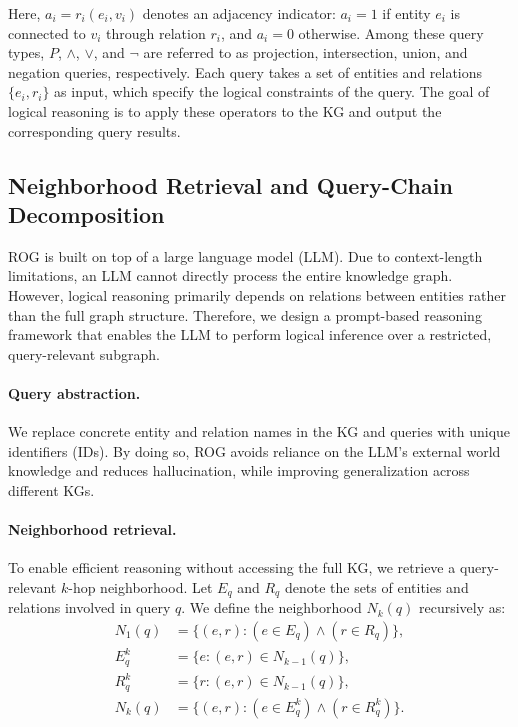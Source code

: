 \documentclass[11pt]{article}
\begin{document}
Here, $a_i = r_i(e_i, v_i)$ denotes an adjacency indicator:
$a_i = 1$ if entity $e_i$ is connected to $v_i$ through relation $r_i$, and $a_i = 0$ otherwise.
Among these query types, $P$, $\wedge$, $\vee$, and $\neg$ are referred to as projection, intersection, union, and negation queries, respectively.
Each query takes a set of entities and relations $\{e_i, r_i\}$ as input, which specify the logical constraints of the query.
The goal of logical reasoning is to apply these operators to the KG and output the corresponding query results.

\subsection{Neighborhood Retrieval and Query-Chain Decomposition}
ROG is built on top of a large language model (LLM).
Due to context-length limitations, an LLM cannot directly process the entire knowledge graph.
However, logical reasoning primarily depends on relations between entities rather than the full graph structure.
Therefore, we design a prompt-based reasoning framework that enables the LLM to perform logical inference over a restricted, query-relevant subgraph.


\paragraph{Query abstraction.}
We replace concrete entity and relation names in the KG and queries with unique identifiers (IDs).
By doing so, ROG avoids reliance on the LLM's external world knowledge and reduces hallucination, while improving generalization across different KGs.

\paragraph{Neighborhood retrieval.}
To enable efficient reasoning without accessing the full KG, we retrieve a query-relevant $k$-hop neighborhood.
Let $E_q$ and $R_q$ denote the sets of entities and relations involved in query $q$.
We define the neighborhood $N_k(q)$ recursively as:
\begin{align}
N_1(q) &= \{(e,r) : (e \in E_q) \wedge (r \in R_q)\}, \label{eq:N1} \\
E_q^{k} &= \{e : (e,r) \in N_{k-1}(q)\}, \label{eq:Ek} \\
R_q^{k} &= \{r : (e,r) \in N_{k-1}(q)\}, \label{eq:Rk} \\
N_k(q) &= \{(e,r) : (e \in E_q^{k}) \wedge (r \in R_q^{k})\}. \label{eq:Nk}
\end{align}
\end{document}
